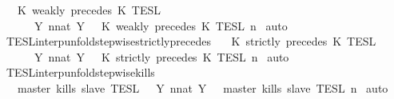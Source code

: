 \begin{isabellebody}
\ \ {\isacartoucheopen}{\isasymlbrakk}\ K\ weakly\ precedes\ K\ {\isasymrbrakk}\isactrlsub T\isactrlsub E\isactrlsub S\isactrlsub L\isanewline
\ \ \ \ {\isacharequal}\ {\isasymInter}\ {\isacharbraceleft}Y{\isachardot}\ {\isasymexists}n{\isacharcolon}{\isacharcolon}nat{\isachardot}\ Y\ {\isacharequal}\ {\isasymlbrakk}\ K\ weakly\ precedes\ K\ {\isasymrbrakk}\isactrlsub T\isactrlsub E\isactrlsub S\isactrlsub L\isactrlbsup {\isasymge}\ n\isactrlesup {\isacharbraceright}{\isacartoucheclose}\isanewline
%
\isadelimproof
%
\endisadelimproof
%
\isatagproof
{}\isamarkupfalse%
\ auto%
\endisatagproof
{\isafoldproof}%
%
\isadelimproof
\isanewline
%
\endisadelimproof
\isanewline
{}\isamarkupfalse%
\ TESL{\isacharunderscore}interp{\isacharunderscore}unfold{\isacharunderscore}stepwise{\isacharunderscore}strictly{\isacharunderscore}precedes{\isacharcolon}\isanewline
\ \ {\isacartoucheopen}{\isasymlbrakk}\ K\ strictly\ precedes\ K\ {\isasymrbrakk}\isactrlsub T\isactrlsub E\isactrlsub S\isactrlsub L\isanewline
\ \ \ \ {\isacharequal}\ {\isasymInter}\ {\isacharbraceleft}Y{\isachardot}\ {\isasymexists}n{\isacharcolon}{\isacharcolon}nat{\isachardot}\ Y\ {\isacharequal}\ {\isasymlbrakk}\ K\ strictly\ precedes\ K\ {\isasymrbrakk}\isactrlsub T\isactrlsub E\isactrlsub S\isactrlsub L\isactrlbsup {\isasymge}\ n\isactrlesup {\isacharbraceright}{\isacartoucheclose}\isanewline
%
\isadelimproof
%
\endisadelimproof
%
\isatagproof
{}\isamarkupfalse%
\ auto%
\endisatagproof
{\isafoldproof}%
%
\isadelimproof
\isanewline
%
\endisadelimproof
\isanewline
{}\isamarkupfalse%
\ TESL{\isacharunderscore}interp{\isacharunderscore}unfold{\isacharunderscore}stepwise{\isacharunderscore}kills{\isacharcolon}\isanewline
\ \ {\isacartoucheopen}{\isasymlbrakk}\ master\ kills\ slave\ {\isasymrbrakk}\isactrlsub T\isactrlsub E\isactrlsub S\isactrlsub L\ {\isacharequal}\ {\isasymInter}\ {\isacharbraceleft}Y{\isachardot}\ {\isasymexists}n{\isacharcolon}{\isacharcolon}nat{\isachardot}\ Y\ {\isacharequal}\ {\isasymlbrakk}\ master\ kills\ slave\ {\isasymrbrakk}\isactrlsub T\isactrlsub E\isactrlsub S\isactrlsub L\isactrlbsup {\isasymge}\ n\isactrlesup {\isacharbraceright}{\isacartoucheclose}\isanewline
%
\isadelimproof
%
\endisadelimproof
%
\isatagproof
{}\isamarkupfalse%
\ auto%
\endisatagproof
{\isafoldproof}%
%
\isadelimproof
\isanewline

\end{isabellebody}
